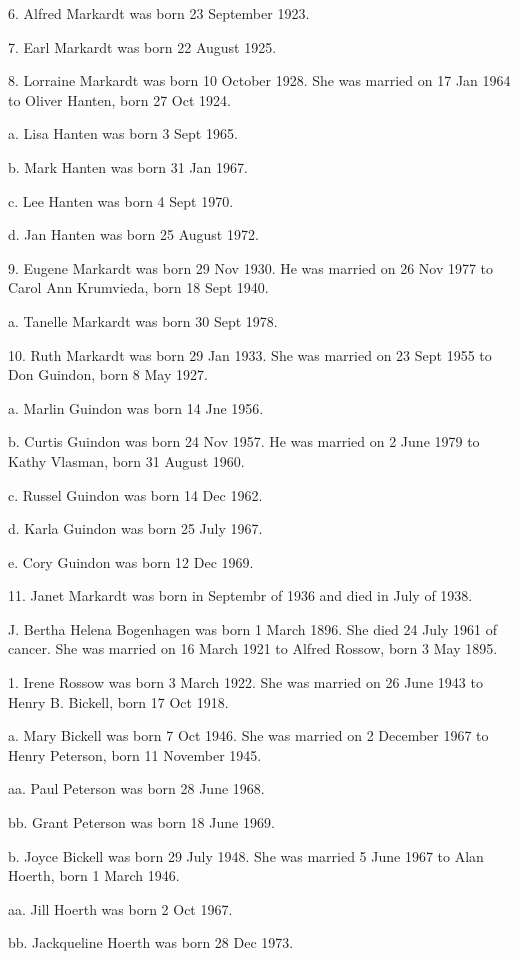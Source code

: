 \documentclass[a4paper]{article}
\begin{document}
6. Alfred Markardt was born 23 September 1923.

7. Earl Markardt was born 22 August 1925.

8. Lorraine Markardt was born 10 October 1928.  She was married on 17 Jan 1964 to Oliver Hanten, born 27 Oct 1924.
 
a. Lisa Hanten was born 3 Sept 1965. 

b. Mark Hanten was born 31 Jan 1967.

c. Lee Hanten was born 4 Sept 1970.

d. Jan Hanten was born 25 August 1972.

9. Eugene Markardt was born 29 Nov 1930.  He was married on 26 Nov 1977 to Carol Ann Krumvieda, born 18 Sept 1940.
 
a. Tanelle Markardt was born 30 Sept 1978.

10. Ruth Markardt was born 29 Jan 1933.  She was married on 23 Sept 1955 to Don Guindon, born 8 May 1927.
 
a. Marlin Guindon was born 14 Jne 1956.

b. Curtis Guindon was born 24 Nov 1957.  He was married on 2 June 1979 to Kathy Vlasman, born 31 August 1960.
 
c. Russel Guindon was born 14 Dec 1962.

d. Karla Guindon was born 25 July 1967.

e. Cory Guindon was born 12 Dec 1969.

11. Janet Markardt was born in Septembr of 1936 and died in July of 1938.

J. Bertha Helena Bogenhagen was born 1 March 1896.  She died 24 July 1961 of cancer. She was married on 16 March 1921 to Alfred Rossow, born 3 May 1895.
 
1. Irene Rossow was born 3 March 1922.  She was married on 26 June 1943 to Henry B. Bickell, born 17 Oct 1918.
 
a. Mary Bickell was born 7 Oct 1946.  She was married on 2 December 1967 to Henry Peterson, born 11 November 1945.
 
aa. Paul Peterson was born 28 June 1968.

bb. Grant Peterson was born 18 June 1969.

b. Joyce Bickell was born 29 July 1948.  She was married 5 June 1967 to Alan Hoerth, born 1 March 1946.
 
aa. Jill Hoerth was born 2 Oct 1967.

bb. Jackqueline Hoerth was born 28 Dec 1973.
\end{document}
